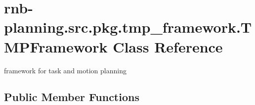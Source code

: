 \hypertarget{classrnb-planning_1_1src_1_1pkg_1_1tmp__framework_1_1_t_m_p_framework}{}\section{rnb-\/planning.src.\+pkg.\+tmp\+\_\+framework.\+T\+M\+P\+Framework Class Reference}
\label{classrnb-planning_1_1src_1_1pkg_1_1tmp__framework_1_1_t_m_p_framework}


framework for task and motion planning  


\subsection*{Public Member Functions}
